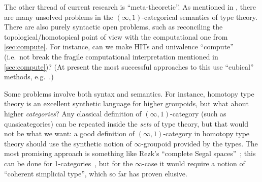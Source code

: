 \documentclass[10pt]{article}
\def\oo{\ensuremath{\infty}}
\def\io{\ensuremath{(\oo,1)}}
\numberwithin{equation}{section}
\begin{document}

The other thread of current research is ``meta-theoretic''.
As mentioned in , there are many unsolved problems in the $\io$-categorical semantics of type theory.
There are also purely syntactic open problems, such as reconciling the topological/homotopical point of view with the computational one from \cref{sec:compute}.
For instance, can we make HITs and univalence ``compute'' (i.e.\ not break the fragile computational interpretation mentioned in \cref{sec:compute})?
(At present the most successful approaches to this use ``cubical'' methods, e.g.~\cite{coquand:ctt0915,cohen:cubicaltt,ahw:chtt-i,ah:chtt-ii}.)

Some problems involve both syntax and semantics.
For instance, homotopy type theory is an excellent synthetic language for higher groupoids, but what about higher \emph{categories}?
Any classical definition of \io-category (such as quasicategories) can be repeated inside the \emph{sets} of type theory, but that would not be what we want: a good definition of \io-category in homotopy type theory should use the synthetic notion of \oo-groupoid provided by the types.
The most promising approach is something like Rezk's ``complete Segal spaces''~\cite{rezk:css}; this can be done for 1-categories~\cite{aks:rezk}, but for the \oo-case it would require a notion of ``coherent simplicial type'', which so far has proven elusive.

\end{document}
